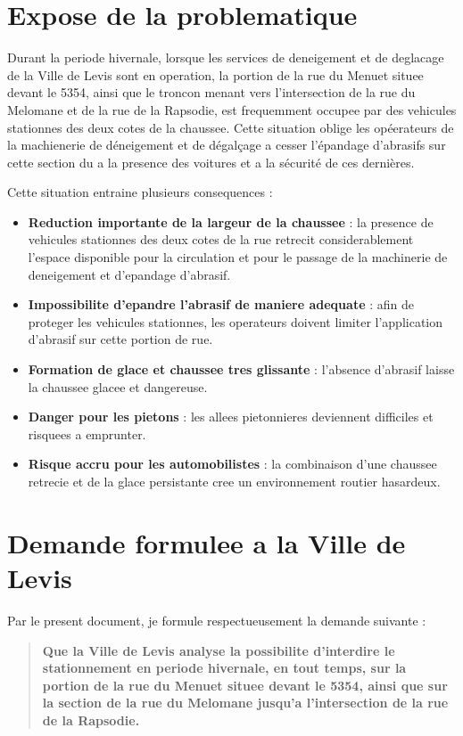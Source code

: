 \documentclass[11pt,a4paper]{article}
\begin{document}
\section*{Expose de la problematique}

Durant la periode hivernale, lorsque les services de deneigement et de deglacage de la Ville de Levis sont en operation, la portion de la rue du Menuet situee devant le 5354, ainsi que le troncon menant vers l'intersection de la rue du Melomane et de la rue de la Rapsodie, est frequemment occupee par des vehicules stationnes des deux cotes de la chaussee. Cette situation oblige les opéerateurs de la machienerie de déneigement et de dégalçage a cesser l'épandage d'abrasifs sur cette section du a la presence des voitures et a la sécurité de ces dernières.

Cette situation entraine plusieurs consequences :

\begin{itemize}
  \item \textbf{Reduction importante de la largeur de la chaussee} : la presence de vehicules stationnes des deux cotes de la rue retrecit considerablement l'espace disponible pour la circulation et pour le passage de la machinerie de deneigement et d'epandage d'abrasif.
  \item \textbf{Impossibilite d'epandre l'abrasif de maniere adequate} : afin de proteger les vehicules stationnes, les operateurs doivent limiter l'application d'abrasif sur cette portion de rue.
  \item \textbf{Formation de glace et chaussee tres glissante} : l'absence d'abrasif laisse la chaussee glacee et dangereuse.
  \item \textbf{Danger pour les pietons} : les allees pietonnieres deviennent difficiles et risquees a emprunter.
  \item \textbf{Risque accru pour les automobilistes} : la combinaison d'une chaussee retrecie et de la glace persistante cree un environnement routier hasardeux.
\end{itemize}

\section*{Demande formulee a la Ville de Levis}

Par le present document, je formule respectueusement la demande suivante :

\begin{quote}
\textbf{Que la Ville de Levis analyse la possibilite d'interdire le stationnement en periode hivernale, en tout temps, sur la portion de la rue du Menuet situee devant le 5354, ainsi que sur la section de la rue du Melomane jusqu'a l'intersection de la rue de la Rapsodie.}
\end{quote}
\end{document}
